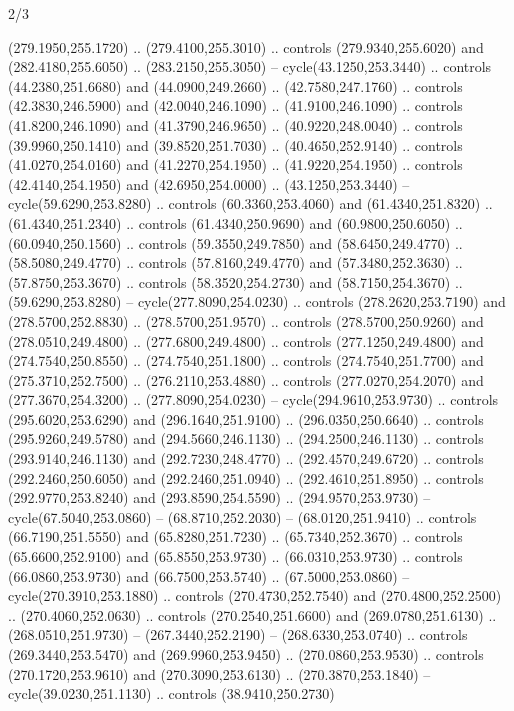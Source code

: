 \begin{flagdescription}{2/3}
\begin{scope}[xshift=0.5\flaglength,yshift=0.5\flagwidth,scale=\stretchfactor]
\begin{scope}[scale=0.001645\flagwidth,yshift=65mm,xshift=-63mm]
\begin{scope}[y=0.80pt, x=0.80pt, yscale=-1,]
\begin{scope}[cm={{1.33333,0.0,0.0,1.33333,(0.0,1e-05)}}]
  (279.1950,255.1720) .. (279.4100,255.3010) .. controls (279.9340,255.6020) and
  (282.4180,255.6050) .. (283.2150,255.3050) -- cycle(43.1250,253.3440) ..
  controls (44.2380,251.6680) and (44.0900,249.2660) .. (42.7580,247.1760) ..
  controls (42.3830,246.5900) and (42.0040,246.1090) .. (41.9100,246.1090) ..
  controls (41.8200,246.1090) and (41.3790,246.9650) .. (40.9220,248.0040) ..
  controls (39.9960,250.1410) and (39.8520,251.7030) .. (40.4650,252.9140) ..
  controls (41.0270,254.0160) and (41.2270,254.1950) .. (41.9220,254.1950) ..
  controls (42.4140,254.1950) and (42.6950,254.0000) .. (43.1250,253.3440) --
  cycle(59.6290,253.8280) .. controls (60.3360,253.4060) and (61.4340,251.8320)
  .. (61.4340,251.2340) .. controls (61.4340,250.9690) and (60.9800,250.6050) ..
  (60.0940,250.1560) .. controls (59.3550,249.7850) and (58.6450,249.4770) ..
  (58.5080,249.4770) .. controls (57.8160,249.4770) and (57.3480,252.3630) ..
  (57.8750,253.3670) .. controls (58.3520,254.2730) and (58.7150,254.3670) ..
  (59.6290,253.8280) -- cycle(277.8090,254.0230) .. controls (278.2620,253.7190)
  and (278.5700,252.8830) .. (278.5700,251.9570) .. controls (278.5700,250.9260)
  and (278.0510,249.4800) .. (277.6800,249.4800) .. controls (277.1250,249.4800)
  and (274.7540,250.8550) .. (274.7540,251.1800) .. controls (274.7540,251.7700)
  and (275.3710,252.7500) .. (276.2110,253.4880) .. controls (277.0270,254.2070)
  and (277.3670,254.3200) .. (277.8090,254.0230) -- cycle(294.9610,253.9730) ..
  controls (295.6020,253.6290) and (296.1640,251.9100) .. (296.0350,250.6640) ..
  controls (295.9260,249.5780) and (294.5660,246.1130) .. (294.2500,246.1130) ..
  controls (293.9140,246.1130) and (292.7230,248.4770) .. (292.4570,249.6720) ..
  controls (292.2460,250.6050) and (292.2460,251.0940) .. (292.4610,251.8950) ..
  controls (292.9770,253.8240) and (293.8590,254.5590) .. (294.9570,253.9730) --
  cycle(67.5040,253.0860) -- (68.8710,252.2030) -- (68.0120,251.9410) ..
  controls (66.7190,251.5550) and (65.8280,251.7230) .. (65.7340,252.3670) ..
  controls (65.6600,252.9100) and (65.8550,253.9730) .. (66.0310,253.9730) ..
  controls (66.0860,253.9730) and (66.7500,253.5740) .. (67.5000,253.0860) --
  cycle(270.3910,253.1880) .. controls (270.4730,252.7540) and
  (270.4800,252.2500) .. (270.4060,252.0630) .. controls (270.2540,251.6600) and
  (269.0780,251.6130) .. (268.0510,251.9730) -- (267.3440,252.2190) --
  (268.6330,253.0740) .. controls (269.3440,253.5470) and (269.9960,253.9450) ..
  (270.0860,253.9530) .. controls (270.1720,253.9610) and (270.3090,253.6130) ..
  (270.3870,253.1840) -- cycle(39.0230,251.1130) .. controls (38.9410,250.2730)

\end{scope}
\end{scope}
\end{scope}
\end{scope}
\end{flagdescription}
